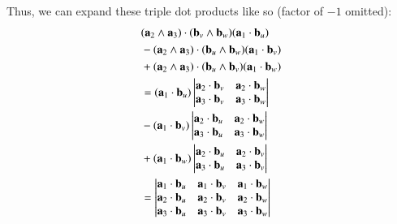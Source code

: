 \documentclass{article}      %
\begin{document}
Thus, we can expand these triple dot products like so (factor of $-1$ omitted):
\begin{align*}
&(\mathbf{a}_2 \wedge \mathbf{a}_3) \cdot (\mathbf{b}_v \wedge \mathbf{b}_w) (\mathbf{a}_1 \cdot \mathbf{b}_u) \\
&-(\mathbf{a}_2 \wedge \mathbf{a}_3) \cdot (\mathbf{b}_u \wedge \mathbf{b}_w) (\mathbf{a}_1 \cdot \mathbf{b}_v) \\
&+(\mathbf{a}_2 \wedge \mathbf{a}_3) \cdot (\mathbf{b}_u \wedge \mathbf{b}_v) (\mathbf{a}_1 \cdot \mathbf{b}_w)  \\
&=
(\mathbf{a}_1 \cdot \mathbf{b}_u) 
\begin{vmatrix}
\mathbf{a}_2 \cdot \mathbf{b}_v & \mathbf{a}_2 \cdot \mathbf{b}_w \\
\mathbf{a}_3 \cdot \mathbf{b}_v & \mathbf{a}_3 \cdot \mathbf{b}_w \\
\end{vmatrix} \\
&-
(\mathbf{a}_1 \cdot \mathbf{b}_v) 
\begin{vmatrix}
\mathbf{a}_2 \cdot \mathbf{b}_u & \mathbf{a}_2 \cdot \mathbf{b}_w \\
\mathbf{a}_3 \cdot \mathbf{b}_u & \mathbf{a}_3 \cdot \mathbf{b}_w \\
\end{vmatrix} \\
&+
(\mathbf{a}_1 \cdot \mathbf{b}_w) 
\begin{vmatrix}
\mathbf{a}_2 \cdot \mathbf{b}_u & \mathbf{a}_2 \cdot \mathbf{b}_v \\
\mathbf{a}_3 \cdot \mathbf{b}_u & \mathbf{a}_3 \cdot \mathbf{b}_v \\
\end{vmatrix} \\
&=
\begin{vmatrix}
\mathbf{a}_1 \cdot \mathbf{b}_u & \mathbf{a}_1 \cdot \mathbf{b}_v & \mathbf{a}_1 \cdot \mathbf{b}_w \\
\mathbf{a}_2 \cdot \mathbf{b}_u & \mathbf{a}_2 \cdot \mathbf{b}_v & \mathbf{a}_2 \cdot \mathbf{b}_w \\
\mathbf{a}_3 \cdot \mathbf{b}_u & \mathbf{a}_3 \cdot \mathbf{b}_v & \mathbf{a}_3 \cdot \mathbf{b}_w \\
\end{vmatrix} \\
\end{align*}
\end{document}
